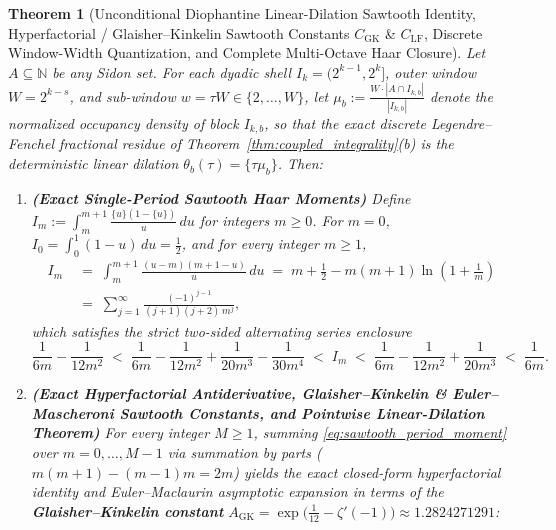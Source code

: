 \documentclass[11pt,reqno]{amsart}
\newtheorem{theorem}{Theorem}[section]
\theoremstyle{definition}
\theoremstyle{remark}
\begin{document}
\begin{theorem}[Unconditional Diophantine Linear-Dilation Sawtooth Identity, Hyperfactorial / Glaisher--Kinkelin Sawtooth Constants $C_{\mathrm{GK}}$ \& $C_{\mathrm{LF}}$, Discrete Window-Width Quantization, and Complete Multi-Octave Haar Closure]\label{thm:unconditional_diophantine_haar}
Let $A \subseteq \mathbb{N}$ be any Sidon set. For each dyadic shell $I_k = (2^{k-1}, 2^k]$, outer window $W = 2^{k-s}$, and sub-window $w = \tau W \in \{2, \dots, W\}$, let $\mu_b := \frac{W \cdot |A \cap I_{k,b}|}{|I_{k,b}|}$ denote the normalized occupancy density of block $I_{k,b}$, so that the exact discrete Legendre--Fenchel fractional residue of Theorem~\ref{thm:coupled_integrality}(b) is the deterministic linear dilation $\theta_b(\tau) = \{\tau \mu_b\}$. Then:
\begin{enumerate}
  \item[\textup{(a)}] \textbf{(Exact Single-Period Sawtooth Haar Moments)} Define $I_m := \int_m^{m+1} \frac{\{u\}(1 - \{u\})}{u}\,du$ for integers $m \ge 0$. For $m = 0$, $I_0 = \int_0^1 (1 - u)\,du = \frac{1}{2}$, and for every integer $m \ge 1$,
  \begin{equation}\label{eq:sawtooth_period_moment}
    \begin{aligned}
      I_m &\;=\; \int_m^{m+1} \frac{(u - m)(m + 1 - u)}{u}\,du \;=\; m + \frac{1}{2} - m(m + 1)\ln\left(1 + \frac{1}{m}\right) \\
      &\;=\; \sum_{j=1}^\infty \frac{(-1)^{j-1}}{(j + 1)(j + 2)\,m^j},
    \end{aligned}
  \end{equation}
  which satisfies the strict two-sided alternating series enclosure
  \begin{equation}\label{eq:sawtooth_period_bounds}
    \frac{1}{6m} - \frac{1}{12m^2} \;<\; \frac{1}{6m} - \frac{1}{12m^2} + \frac{1}{20m^3} - \frac{1}{30m^4} \;<\; I_m \;<\; \frac{1}{6m} - \frac{1}{12m^2} + \frac{1}{20m^3} \;<\; \frac{1}{6m}.
  \end{equation}
  \item[\textup{(b)}] \textbf{(Exact Hyperfactorial Antiderivative, Glaisher--Kinkelin \& Euler--Mascheroni Sawtooth Constants, and Pointwise Linear-Dilation Theorem)} For every integer $M \ge 1$, summing \eqref{eq:sawtooth_period_moment} over $m = 0, \dots, M - 1$ via summation by parts ($m(m+1) - (m-1)m = 2m$) yields the exact closed-form hyperfactorial identity and Euler--Maclaurin asymptotic expansion in terms of the \textbf{Glaisher--Kinkelin constant} $A_{\mathrm{GK}} = \exp\bigl(\frac{1}{12} - \zeta'(-1)\bigr) \approx 1.2824271291$:

\end{enumerate}
\end{theorem}
\end{document}
